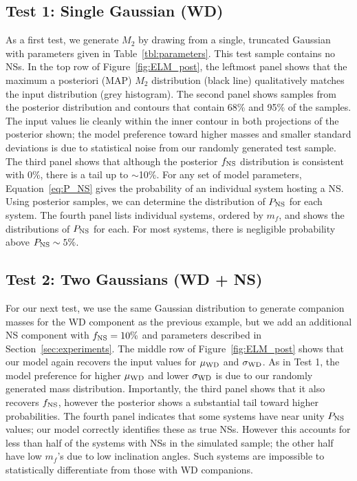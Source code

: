\documentclass[apjl]{emulateapj}
\newcommand{\mf}{m_f}
\begin{document}
\subsection{Test 1: Single Gaussian (WD)} \label{sec:exp1}

As a first test, we generate $M_2$ by drawing from a single, truncated Gaussian with parameters given in Table~\ref{tbl:parameters}. This test sample contains no NSs. In the top row of Figure~\ref{fig:ELM_post}, the leftmost panel shows that the maximum a posteriori (MAP) $M_2$ distribution (black line) qualitatively matches the input distribution (grey histogram). The second panel shows samples from the posterior distribution and contours that contain 68\% and 95\% of the samples. The input values lie cleanly within the inner contour in both projections of the posterior shown; the model preference toward higher masses and smaller standard deviations is due to statistical noise from our randomly generated test sample. The third panel shows that although the posterior $f_{\rm NS}$ distribution is consistent with 0\%, there is a tail up to $\sim$10\%. 
For any set of model parameters, Equation~\ref{eq:P_NS} gives the probability of an individual system hosting a NS. Using posterior samples, we can determine the distribution of $P_{\rm NS}$ for each system. The fourth panel lists individual systems, ordered by $\mf$, and shows the distributions of $P_{\rm NS}$ for each. For most systems, there is negligible probability above $P_{\rm NS}\sim 5\%$.



\subsection{Test 2: Two Gaussians (WD + NS)} \label{sec:exp2}
For our next test, we use the same Gaussian distribution to generate companion masses for the WD component as the previous example, but we add an additional NS component with $f_{\rm NS} = 10\%$ and parameters described in Section~\ref{sec:experiments}. The middle row of Figure~\ref{fig:ELM_post} shows that our model again recovers the input values for $\mu_{\rm WD}$ and $\sigma_{\rm WD}$. As in Test 1, the model preference for higher $\mu_{\rm WD}$ and lower $\sigma_{\rm WD}$ is due to our randomly generated mass distribution. Importantly, the third panel shows that it also recovers $f_{\rm NS}$, however the posterior shows a substantial tail toward higher probabilities. The fourth panel indicates that some systems have near unity $P_{\rm NS}$ values; our model correctly identifies these as true NSs. However this accounts for less than half of the systems with NSs in the simulated sample; the other half have low $\mf$'s due to low inclination angles. Such systems are impossible to statistically differentiate from those with WD companions. 
\end{document}
